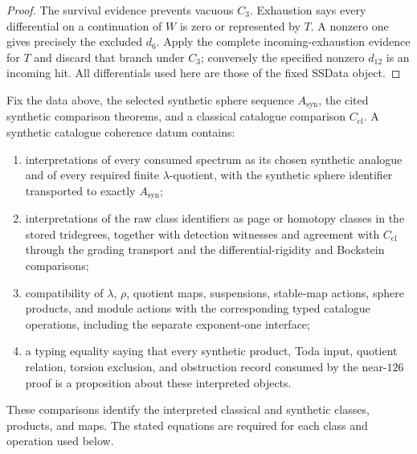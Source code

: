 \begin{proof}
  The survival evidence prevents vacuous $C_3$.  Exhaustion says every
  differential on a continuation of $W$ is zero or represented by $T$.
  A nonzero one gives precisely the excluded $d_6$.
  Apply the complete incoming-exhaustion evidence for $T$ and discard that
  branch under $C_3$; conversely the specified nonzero $d_{12}$ is an incoming
  hit.  All differentials used here are those of the fixed SSData object.
\end{proof}



\begin{definition}
  \label{def:synthetic-catalogue-coherence}
  \notready
  Fix the data above, the selected synthetic sphere sequence
  $A_{\mathrm{syn}}$, the cited synthetic comparison theorems, and a classical
  catalogue comparison $C_{\mathrm{cl}}$.  A synthetic catalogue
  coherence datum contains:
  \begin{enumerate}
    \item interpretations of every consumed spectrum as its chosen synthetic
      analogue and of every required finite $\lambda$-quotient, with the
      synthetic sphere identifier transported to exactly $A_{\mathrm{syn}}$;
    \item interpretations of the raw class identifiers as page or homotopy
      classes in the stored tridegrees, together with detection witnesses and
      agreement with $C_{\mathrm{cl}}$ through the grading transport and the
      differential-rigidity and Bockstein comparisons;
    \item compatibility of $\lambda$, $\rho$, quotient maps, suspensions,
      stable-map actions, sphere products, and module actions with the
      corresponding typed catalogue operations, including the separate
      exponent-one interface;
    \item a typing equality saying that every synthetic product, Toda input,
      quotient relation, torsion exclusion, and obstruction record consumed by
      the near-$126$ proof is a proposition about these interpreted objects.
  \end{enumerate}
  These comparisons identify the interpreted classical and synthetic
  classes, products, and maps. The stated equations are required for each
  class and operation used below.
\end{definition}

